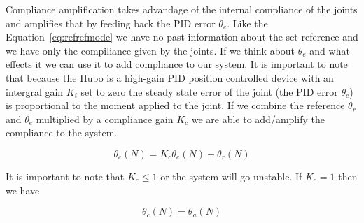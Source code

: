 Compliance amplification takes advandage of the internal compliance of the joints and amplifies that by feeding back the PID error $\theta_e$.
Like the Equation~\ref{eq:refrefmode} we have no past information about the set reference and we have only the compiliance given by the joints.
If we think about $\theta_e$ and what effects it we can use it to add compliance to our system.
It is important to note that because the Hubo is a high-gain PID position controlled device with an intergral gain $K_i$ set to zero the steady state error of the joint (the PID error $\theta_e$) is proportional to the moment applied to the joint.
If we combine the reference $\theta_r$ and $\theta_e$ multiplied by a compliance gain $K_c$ we are able to add/amplify the compliance to the system.

\begin{equation}
\theta_c(N) = K_c\theta_e(N)+\theta_r(N)
\end{equation}

It is important to note that $K_c \leq 1$ or the system will go unstable.
If $K_c=1$ then we have

\begin{equation}
\theta_c(N) = \theta_a(N)
\end{equation}

